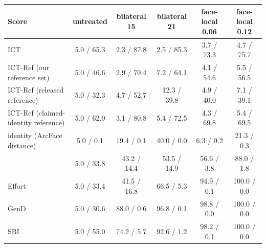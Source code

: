 \begin{tabular}{@{}l ccccc@{}}
\toprule
Score & untreated & bilateral 15 & bilateral 21 & face-local 0.06 & face-local 0.12 \\
\midrule
ICT & 5.0 / 65.3 & 2.3 / 87.8 & 2.5 / 85.3 & 3.7 / 73.3 & 4.7 / 75.7 \\
ICT-Ref (our reference set) & 5.0 / 46.6 & 2.9 / 70.4 & 7.2 / 64.1 & 4.1 / 54.6 & 5.5 / 56.5 \\
ICT-Ref (released reference) & 5.0 / 32.3 & 4.7 / 52.7 & 12.3 / 39.8 & 4.9 / 40.0 & 7.1 / 39.1 \\
ICT-Ref (claimed-identity reference) & 5.0 / 62.9 & 3.1 / 80.8 & 5.4 / 72.5 & 4.3 / 69.8 & 5.4 / 69.5 \\
identity (ArcFace distance) & 5.0 / 0.1 & 19.4 / 0.1 & 40.0 / 0.0 & 6.3 / 0.2 & 21.3 / 0.3 \\
\oursB{} & 5.0 / 33.8 & 43.2 / 14.4 & 53.5 / 14.9 & 56.6 / 3.8 & 88.0 / 1.8 \\
Effort & 5.0 / 33.4 & 41.5 / 16.8 & 66.5 / 5.3 & 94.9 / 0.1 & 100.0 / 0.0 \\
GenD & 5.0 / 30.6 & 88.0 / 0.6 & 96.8 / 0.1 & 98.8 / 0.0 & 100.0 / 0.0 \\
SBI & 5.0 / 55.0 & 74.2 / 5.7 & 92.6 / 1.2 & 98.2 / 0.1 & 100.0 / 0.0 \\
\bottomrule
\end{tabular}

